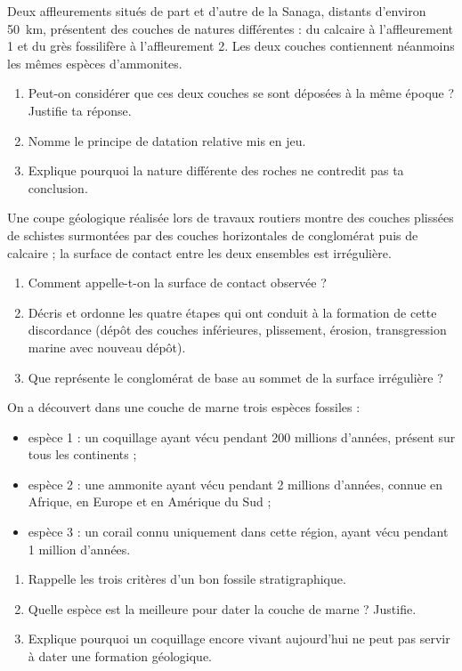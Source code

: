 \documentclass[11pt]{article}
\begin{document}
\begin{exercice}
Deux affleurements situés de part et d'autre de la Sanaga, distants d'environ \SI{50}{km}, présentent des couches de natures différentes : du calcaire à l'affleurement 1 et du grès fossilifère à l'affleurement 2. Les deux couches contiennent néanmoins les mêmes espèces d'ammonites.
\begin{enumerate}
\item Peut-on considérer que ces deux couches se sont déposées à la même époque ? Justifie ta réponse.
\item Nomme le principe de datation relative mis en jeu.
\item Explique pourquoi la nature différente des roches ne contredit pas ta conclusion.
\end{enumerate}
\end{exercice}

\begin{exercice}
Une coupe géologique réalisée lors de travaux routiers montre des couches plissées de schistes surmontées par des couches horizontales de conglomérat puis de calcaire ; la surface de contact entre les deux ensembles est irrégulière.
\begin{enumerate}
\item Comment appelle-t-on la surface de contact observée ?
\item Décris et ordonne les quatre étapes qui ont conduit à la formation de cette discordance (dépôt des couches inférieures, plissement, érosion, transgression marine avec nouveau dépôt).
\item Que représente le conglomérat de base au sommet de la surface irrégulière ?
\end{enumerate}
\end{exercice}

\begin{exercice}
On a découvert dans une couche de marne trois espèces fossiles :
\begin{itemize}
\item espèce 1 : un coquillage ayant vécu pendant 200 millions d'années, présent sur tous les continents ;
\item espèce 2 : une ammonite ayant vécu pendant 2 millions d'années, connue en Afrique, en Europe et en Amérique du Sud ;
\item espèce 3 : un corail connu uniquement dans cette région, ayant vécu pendant 1 million d'années.
\end{itemize}
\begin{enumerate}
\item Rappelle les trois critères d'un bon fossile stratigraphique.
\item Quelle espèce est la meilleure pour dater la couche de marne ? Justifie.
\item Explique pourquoi un coquillage encore vivant aujourd'hui ne peut pas servir à dater une formation géologique.
\end{enumerate}
\end{exercice}
\end{document}

